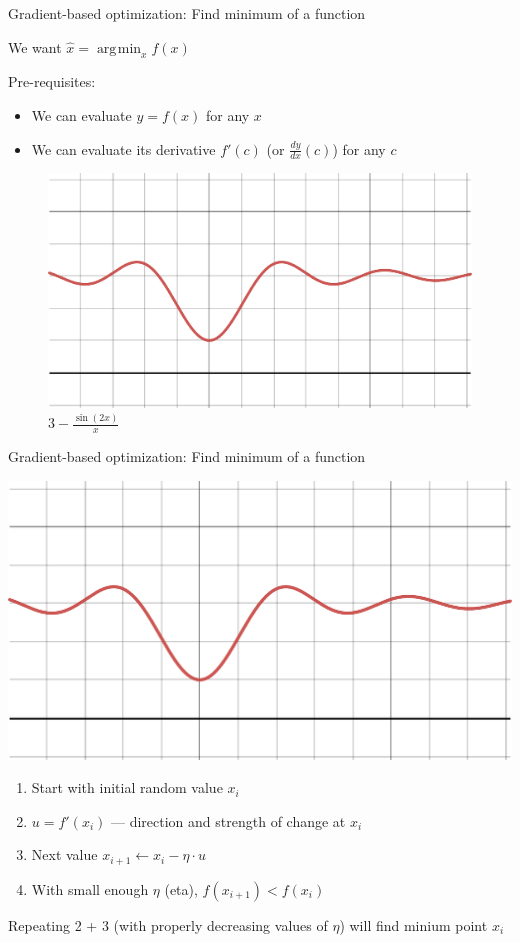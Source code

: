 \documentclass[12pt,aspectratio=169]{beamer}
\DeclareMathOperator*{\argmin}{arg\!\min}
\begin{document}
\begin{frame}{Gradient-based optimization: Find minimum of a function}

We want $\hat{x} = \argmin_x f(x)$
	
Pre-requisites:

\begin{itemize}
	\item We can evaluate $y = f(x)$ for any $x$
	\item We can evaluate its derivative $f'(c)$ (or $\frac{dy}{dx}(c)$) for any $c$
\end{itemize}

\begin{figure}
	\includegraphics[width=0.4\linewidth]{img/desmos-graph1.pdf}	
	\caption{$3-\frac{\sin\left(2x\right)}{x}$}
\end{figure}
	
\end{frame}


\begin{frame}{Gradient-based optimization: Find minimum of a function}
	
\includegraphics[width=0.4\linewidth]{img/desmos-graph1.pdf}
	

\begin{enumerate}
	\item Start with initial random value $x_i$
	\item $u = f'(x_i)$ --- direction and strength of change at $x_i$
	\item Next value $x_{i + 1} \gets x_i - \eta \cdot u$
	\item With small enough $\eta$ (eta), $f(x_{i+1}) < f(x_i)$
\end{enumerate}
Repeating 2 + 3 (with properly decreasing values of $\eta$) will find minium point $x_i$

	
	
\end{frame}
\end{document}
